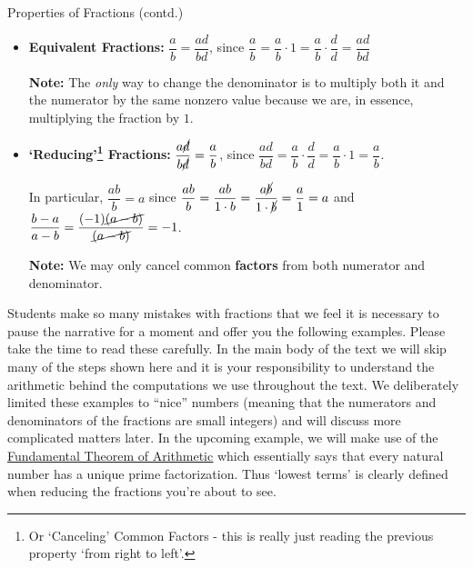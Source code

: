 \begin{floatbox}[label=box:propoffracctd]{Properties of Fractions (contd.)}

\begin{itemize}

\item  \textbf{Equivalent Fractions:}  $\dfrac{a}{b} = \dfrac{ad}{bd}$, since $ \dfrac{a}{b} = \dfrac{a}{b} \cdot 1 = \dfrac{a}{b} \cdot \dfrac{d}{d} = \dfrac{ad}{bd}$

\textbf{Note:}  The \textit{only} way to change the denominator is to multiply both it and the numerator by the same nonzero value because we are, in essence, multiplying the fraction by $1$.

\item  \textbf{`Reducing'\footnote{Or `Canceling' Common Factors - this is really just reading the previous property `from right to left'.} Fractions:} $\dfrac{a\cancel{d}}{b\cancel{d}} = \dfrac{a}{b}$, since  $\dfrac{ad}{bd} = \dfrac{a}{b} \cdot \dfrac{d}{d} = \dfrac{a}{b} \cdot 1 = \dfrac{a}{b}$.

In particular, $\dfrac{ab}{b} = a$ since $\dfrac{ab}{b} = \dfrac{ab}{1 \cdot b} =  \dfrac{a \cancel{b}}{1 \cdot \cancel{b}} = \dfrac{a}{1} = a$ and $\dfrac{b-a}{a-b} = \dfrac{(-1)\cancel{(a-b)}}{\cancel{(a-b)}} = -1$.

\textbf{Note:}  We may only cancel common \textbf{factors} from both numerator and denominator.

\end{itemize}

\end{floatbox}

Students make so many mistakes with fractions that we feel it is necessary to pause the narrative for a moment and offer you the following examples.  Please take the time to read these carefully.  In the main body of the text we will skip many of the steps shown here and it is your responsibility to understand the arithmetic behind the computations we use throughout the text.  We deliberately limited these examples to ``nice'' numbers (meaning that the numerators and denominators of the fractions are small integers) and will discuss more complicated matters later.  In the upcoming example, we will make use of the \href{https://en.wikipedia.org/wiki/Fundamental_theorem_of_arithmetic}{\underline{Fundamental Theorem of Arithmetic}} which essentially says that every natural number has a unique prime factorization.  Thus `lowest terms' is clearly defined when reducing the  fractions you're about to see.


